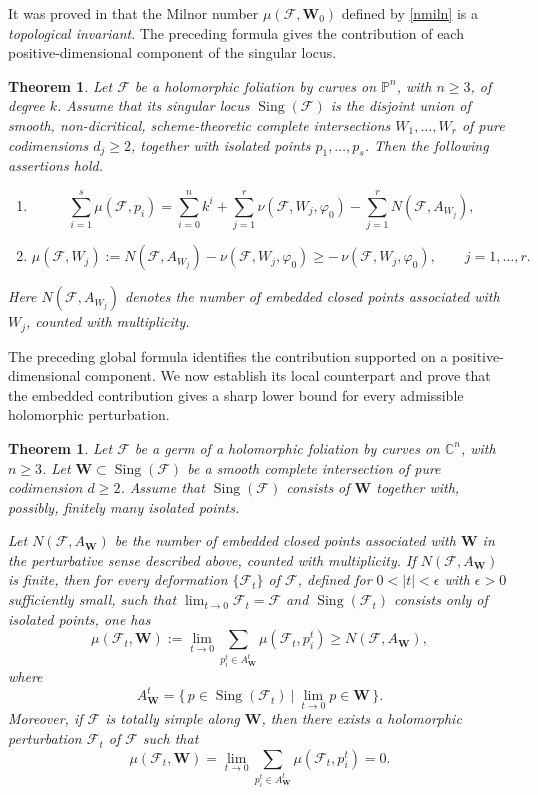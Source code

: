 \documentclass[10pt,twoside]{amsart}
\numberwithin{equation}{section}
\newtheorem{theorem}[proposition]{Theorem}
\theoremstyle{definition}
\theoremstyle{remark}
\DeclareMathOperator{\sing}{Sing}
\newcommand{\fol}{\mathcal{F}}
\newcommand{\W}{\mathbf{W}}
\begin{document}
It was proved in \cite{AGR} that the Milnor number $\mu(\fol,\W_0)$ defined by \eqref{nmiln} is a \emph{topological invariant}. The preceding formula gives the contribution of each positive-dimensional component of the singular locus.

\begin{theorem}\label{theorem1}
Let $\fol$ be a holomorphic foliation by curves on $\mathbb{P}^{n}$, with $n\geq3$, of degree $k$.
Assume that its singular locus $\sing(\fol)$ is the disjoint union of smooth, non-dicritical, scheme-theoretic complete intersections
$W_1,\ldots,W_r$ of pure codimensions $d_j\geq 2$, together with isolated points $p_1,\ldots,p_s$.
Then the following assertions hold.
\begin{enumerate}
\item[(i)]
\[
\sum_{i=1}^{s}\mu(\fol,p_i)
=
\sum_{i=0}^{n}k^i
+\sum_{j=1}^{r}\nu(\fol,W_j,\varphi_0)
-\sum_{j=1}^{r}N(\fol,A_{W_j}) ,
\]
\item[(ii)]
\[
\mu(\fol,W_j)
:=
N(\fol,A_{W_j})-\nu(\fol,W_j,\varphi_0)
\geq -\,\nu(\fol,W_j,\varphi_0),
\qquad j=1,\ldots,r.
\]
\end{enumerate}
Here $N(\fol,A_{W_j})$ denotes the number of embedded closed points associated with $W_j$, counted with multiplicity.
\end{theorem}

The preceding global formula identifies the contribution supported on a positive-dimensional component. We now establish its local counterpart and prove that the embedded contribution gives a sharp lower bound for every admissible holomorphic perturbation.

\begin{theorem}\label{theorem2}
Let $\fol$ be a germ of a holomorphic foliation by curves on $\mathbb{C}^n$, with $n\geq3$.
Let $\W\subset \sing(\fol)$ be a smooth complete intersection of pure codimension $d\geq2$.
Assume that $\sing(\fol)$ consists of $\W$ together with, possibly, finitely many isolated points.

Let $N(\fol,A_{\W})$ be the number of embedded closed points associated with $\W$ in the perturbative sense described above, counted with multiplicity.
If $N(\fol,A_{\W})$ is finite, then for every deformation $\{\fol_t\}$ of $\fol$, defined for $0<|t|<\epsilon$ with $\epsilon>0$ sufficiently small, such that $\lim_{t\to 0}\fol_t=\fol$ and $\sing(\fol_t)$ consists only of isolated points, one has
\begin{equation}\label{eq:lowerbound}
\mu(\fol_t,\W)
:=
\lim_{t\to 0}\sum_{p_i^t\in A_{\W}^t}\mu(\fol_t,p_i^t)
\geq N(\fol,A_{\W}),
\end{equation}
where
\[
A_{\W}^t
=
\bigl\{\, p\in \sing(\fol_t)\ \big|\ \lim_{t\to 0}p\in \W \,\bigr\}.
\]
Moreover, if $\fol$ is totally simple along $\W$, then there exists a holomorphic perturbation $\fol_t$ of $\fol$ such that
\begin{equation}\label{eq:totallysimplezero}
\mu(\fol_t,\W)
=
\lim_{t\to 0}\sum_{p_i^t\in A_{\W}^t}\mu(\fol_t,p_i^t)
=0.
\end{equation}
\end{theorem}
\end{document}
